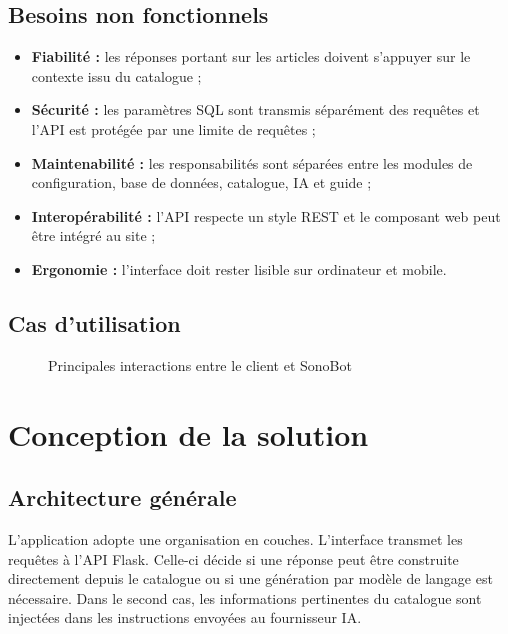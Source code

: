 \documentclass[12pt,a4paper,oneside]{report}
\begin{document}
\section{Besoins non fonctionnels}
\begin{itemize}
  \item \textbf{Fiabilité :} les réponses portant sur les articles doivent s'appuyer sur le contexte issu du catalogue ;
  \item \textbf{Sécurité :} les paramètres SQL sont transmis séparément des requêtes et l'API est protégée par une limite de requêtes ;
  \item \textbf{Maintenabilité :} les responsabilités sont séparées entre les modules de configuration, base de données, catalogue, IA et guide ;
  \item \textbf{Interopérabilité :} l'API respecte un style REST et le composant web peut être intégré au site ;
  \item \textbf{Ergonomie :} l'interface doit rester lisible sur ordinateur et mobile.
\end{itemize}

\section{Cas d'utilisation}
\begin{figure}[H]
\centering
{}
\caption{Principales interactions entre le client et SonoBot}
\end{figure}

\chapter{Conception de la solution}
\section{Architecture générale}
L'application adopte une organisation en couches. L'interface transmet les requêtes à l'API Flask. Celle-ci décide si une réponse peut être construite directement depuis le catalogue ou si une génération par modèle de langage est nécessaire. Dans le second cas, les informations pertinentes du catalogue sont injectées dans les instructions envoyées au fournisseur IA.
\end{document}
